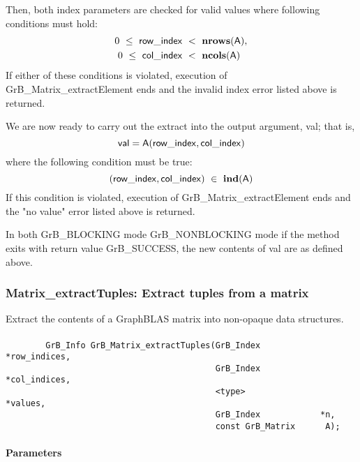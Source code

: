 Then, both index parameters are checked for valid values where following
conditions must hold:
\[
\begin{aligned}
    0\ \leq\ {\sf row\_index} & \ <\ \mathbf{nrows}({\sf A}), \\
    0\ \leq\ {\sf col\_index} & \ <\ \mathbf{ncols}({\sf A})
\end{aligned}
\]
If either of these conditions is violated, execution of 
{\sf GrB\_Matrix\_extractElement} ends and the invalid 
index error listed above is returned. 

We are now ready to carry out the extract into the output argument, {\sf val}; 
that is,
\[
{\sf val} = {\sf A}({\sf row\_index},{\sf col\_index})
\]
where the following condition must be true:
\[
    ({\sf row\_index},{\sf col\_index}) \ \in \ \mathbf{ind}({\sf A})
\]
If this condition is violated, execution of {\sf GrB\_Matrix\_extractElement} 
ends and the "no value" error listed above is returned.


In both {\sf GrB\_BLOCKING} mode {\sf GrB\_NONBLOCKING} mode
if the method exits with return value {\sf GrB\_SUCCESS}, the  new 
contents of  {\sf val} are as defined above.  



\subsubsection{{\sf Matrix\_extractTuples}: Extract tuples from a matrix}
\label{Sec:Matrix_extractTuples}

Extract the contents of a GraphBLAS matrix into non-opaque data structures.

\paragraph{\syntax}

\begin{verbatim}
        GrB_Info GrB_Matrix_extractTuples(GrB_Index            *row_indices,
                                          GrB_Index            *col_indices,
                                          <type>               *values, 
                                          GrB_Index            *n, 
                                          const GrB_Matrix      A);
\end{verbatim}

\paragraph{Parameters}

